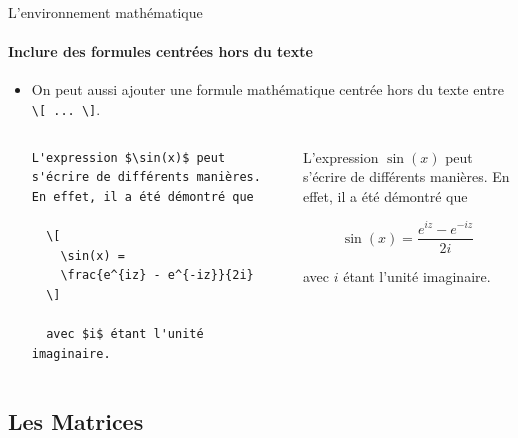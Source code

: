 \begin{frame}[fragile]{L'environnement mathématique}
  \framesubtitle{Inclure des formules centrées hors du texte}
  \begin{itemize}
  \item On peut aussi ajouter une formule mathématique centrée hors du texte entre \lstinline|\[ ... \]|.
  \vspace{0.5cm}
  \begin{columns}
    \begin{column}{0.45\textwidth}
      \begin{lstlisting}[style = nonumbers]
  L'expression $\sin(x)$ peut s'écrire de différents manières. En effet, il a été démontré que

  \[
    \sin(x) =
    \frac{e^{iz} - e^{-iz}}{2i}
  \]

  avec $i$ étant l'unité imaginaire.
      \end{lstlisting}
    \end{column}
    \begin{column}{0.45\textwidth}
      L'expression $\sin(x)$ peut s'écrire de différents manières. En effet, il a été démontré que

      \[ \sin(x) = \frac{e^{iz} - e^{-iz}}{2i} \]

      avec $i$ étant l'unité imaginaire.
    \end{column}
  \end{columns}
  \end{itemize}
\end{frame}

\subsection{Les Matrices}


